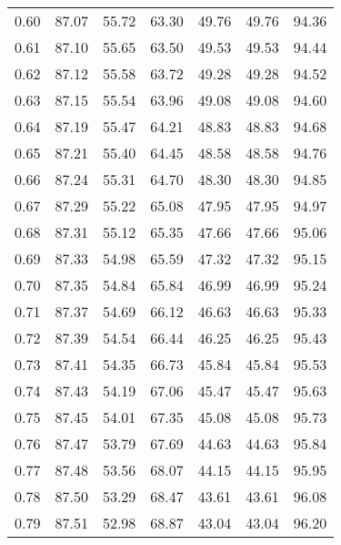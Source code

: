 \begin{tabular}{|c|c|c|c|c|c|c|}
      0.60 &     87.07 &     55.72 &      63.30 &   49.76 &      49.76 &         94.36 \\
      0.61 &     87.10 &     55.65 &      63.50 &   49.53 &      49.53 &         94.44 \\
      0.62 &     87.12 &     55.58 &      63.72 &   49.28 &      49.28 &         94.52 \\
      0.63 &     87.15 &     55.54 &      63.96 &   49.08 &      49.08 &         94.60 \\
      0.64 &     87.19 &     55.47 &      64.21 &   48.83 &      48.83 &         94.68 \\
      0.65 &     87.21 &     55.40 &      64.45 &   48.58 &      48.58 &         94.76 \\
      0.66 &     87.24 &     55.31 &      64.70 &   48.30 &      48.30 &         94.85 \\
      0.67 &     87.29 &     55.22 &      65.08 &   47.95 &      47.95 &         94.97 \\
      0.68 &     87.31 &     55.12 &      65.35 &   47.66 &      47.66 &         95.06 \\
      0.69 &     87.33 &     54.98 &      65.59 &   47.32 &      47.32 &         95.15 \\
      0.70 &     87.35 &     54.84 &      65.84 &   46.99 &      46.99 &         95.24 \\
      0.71 &     87.37 &     54.69 &      66.12 &   46.63 &      46.63 &         95.33 \\
      0.72 &     87.39 &     54.54 &      66.44 &   46.25 &      46.25 &         95.43 \\
      0.73 &     87.41 &     54.35 &      66.73 &   45.84 &      45.84 &         95.53 \\
      0.74 &     87.43 &     54.19 &      67.06 &   45.47 &      45.47 &         95.63 \\
      0.75 &     87.45 &     54.01 &      67.35 &   45.08 &      45.08 &         95.73 \\
      0.76 &     87.47 &     53.79 &      67.69 &   44.63 &      44.63 &         95.84 \\
      0.77 &     87.48 &     53.56 &      68.07 &   44.15 &      44.15 &         95.95 \\
      0.78 &     87.50 &     53.29 &      68.47 &   43.61 &      43.61 &         96.08 \\
      0.79 &     87.51 &     52.98 &      68.87 &   43.04 &      43.04 &         96.20 \\

\end{tabular}
